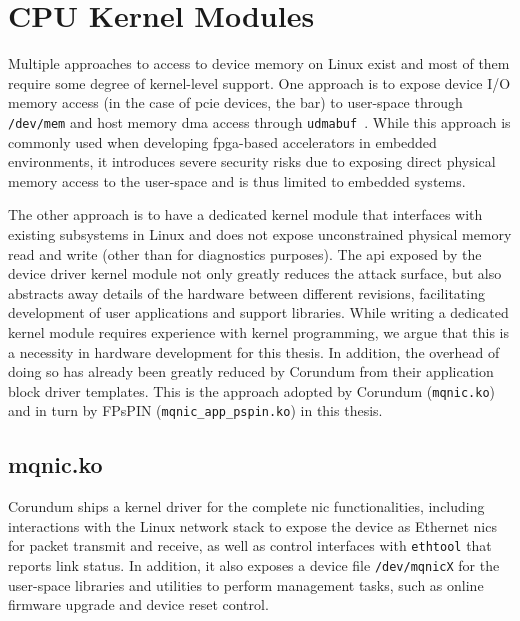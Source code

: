 \section{CPU Kernel Modules} \label{sec:sw-kmod}

Multiple approaches to access to device memory on Linux exist and most of them require some degree of kernel-level support.  One approach is to expose device I/O memory access (in the case of \ac{pcie} devices, the \ac{bar}) to user-space through \texttt{/dev/mem} and host memory \ac{dma} access through \texttt{udmabuf}~\cite{ichiro_u-dma-bufuser_2023}.  While this approach is commonly used when developing \ac{fpga}-based accelerators in embedded environments, it introduces severe security risks due to exposing direct physical memory access to the user-space and is thus limited to embedded systems.

The other approach is to have a dedicated kernel module that interfaces with existing subsystems in Linux and does not expose unconstrained physical memory read and write (other than for diagnostics purposes).  The \ac{api} exposed by the device driver kernel module not only greatly reduces the attack surface, but also abstracts away details of the hardware between different revisions, facilitating development of user applications and support libraries.  While writing a dedicated kernel module requires experience with kernel programming, we argue that this is a necessity in hardware development for this thesis.  In addition, the overhead of doing so has already been greatly reduced by Corundum from their application block driver templates.  This is the approach adopted by Corundum (\texttt{mqnic.ko}) and in turn by FPsPIN (\texttt{mqnic\_\-app\_\-pspin.ko}) in this thesis.

\subsection{mqnic.ko}

Corundum ships a kernel driver for the complete \ac{nic} functionalities, including interactions with the Linux network stack to expose the device as Ethernet \ac{nic}s for packet transmit and receive, as well as control interfaces with \texttt{ethtool} that reports link status.  In addition, it also exposes a device file \texttt{/dev/mqnicX} for the user-space libraries and utilities to perform management tasks, such as online firmware upgrade and device reset control.

